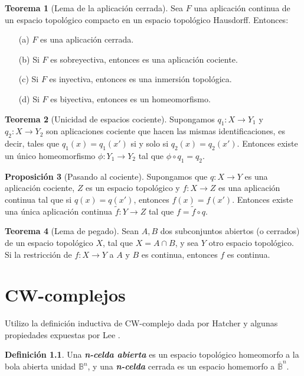 \documentclass[10pt]{report}
\newcommand{\enfatiza}[1]{\textbf{\textit{#1}}}
\theoremstyle{definition}
\newtheorem{defin}{Definición}[section]
\newtheorem{tma}[defin]{Teorema}
\newtheorem{prop}[defin]{Proposición}
\begin{document}
\begin{tma}[Lema de la aplicación cerrada]\label{teo:aplicac_cerrada}
Sea $F$ una aplicación continua de un espacio topológico compacto en un espacio topológico Hausdorff. Entonces:
\begin{itemize}
\item[(a)]$F$ es una aplicación cerrada.
\item[(b)] Si $F$ es sobreyectiva, entonces es una aplicación cociente.
\item[(c)] Si $F$ es inyectiva, entonces es una inmersión topológica. %
\item[(d)] Si $F$ es biyectiva, entonces es un homeomorfismo.
\end{itemize}
\end{tma}

\begin{tma}[Unicidad de espacios cociente]
\label{teo:unicidad_espacio_cociente}
Supongamos $q_1:X\to Y_1$ y $q_2:X\to Y_2$ son aplicaciones cociente que hacen las mismas identificaciones, es decir, tales que $q_1(x)=q_1(x')$ si y solo si $q_2(x)=q_2(x')$. Entonces existe un único homeomorfismo $\phi:Y_1\to Y_2$ tal que $\phi \circ q_1=q_2$.
\end{tma}

\begin{prop}[Pasando al cociente]
Supongamos que $q:X\to Y$ es una aplicación cociente, $Z$ es un espacio topológico y $f:X\to Z$ es una aplicación continua tal que si $q(x)=q(x')$, entonces $f(x)=f(x')$. Entonces existe una única aplicación continua $\tilde{f}:Y\to Z$ tal que $f=\tilde{f} \circ q$.
\end{prop}

\begin{tma}[Lema de pegado]
Sean $A,B$ dos subconjuntos abiertos (o cerrados) de un espacio topológico $X$, tal que $X=A\cap B$, y sea $Y$ otro espacio topológico. Si la restricción de $f:X\to Y$ a $A$ y $B$ es continua, entonces $f$ es continua.
\end{tma}
\chapter{CW-complejos}\label{sec:CW}
Utilizo la definición inductiva de CW-complejo dada por Hatcher \cite{hatcher} y algunas propiedades expuestas por Lee \cite{lee1}.


\begin{defin}
Una \enfatiza{n-celda abierta} es un espacio topológico homeomorfo a la bola abierta unidad $\mathbb{B}^n$, y una \enfatiza{n-celda} cerrada es un espacio homemorfo a $\overline{\mathbb{B}}^n$. 
\end{defin}
\end{document}
